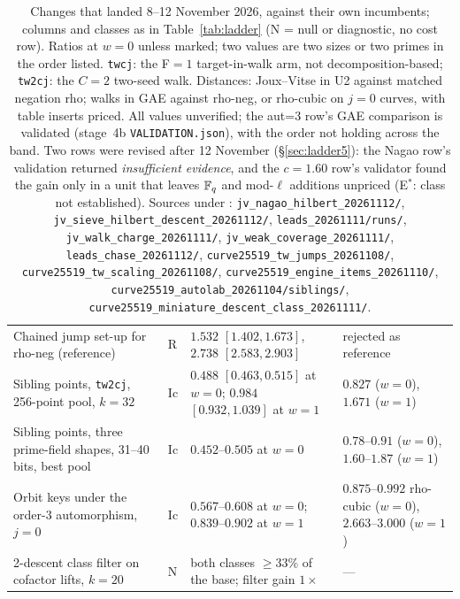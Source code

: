 \begin{table}[p]
\begin{tabularx}{\linewidth}{@{}>{\raggedright}Xl>{\raggedright}p{3.6cm}>{\raggedright\arraybackslash}p{3.4cm}@{}}
Chained jump set-up for rho-neg (reference) & R & $1.532$ $[1.402,1.673]$, $2.738$ $[2.583,2.903]$ & rejected as reference \\
Sibling points, \texttt{tw2cj}, 256-point pool, $k=32$ & Ic & $0.488$ $[0.463,0.515]$ at $w=0$; $0.984$ $[0.932,1.039]$ at $w=1$ & $0.827$ ($w=0$), $1.671$ ($w=1$) \\
Sibling points, three prime-field shapes, 31--40 bits, best pool & Ic & $0.452$--$0.505$ at $w=0$ & $0.78$--$0.91$ ($w=0$), $1.60$--$1.87$ ($w=1$) \\
Orbit keys under the order-3 automorphism, $j=0$ & Ic & $0.567$--$0.608$ at $w=0$; $0.839$--$0.902$ at $w=1$ & $0.875$--$0.992$ rho-cubic ($w=0$), $2.663$--$3.000$ ($w=1$) \\
2-descent class filter on cofactor lifts, $k=20$ & N & both classes $\ge33\%$ of the base; filter gain $1\times$ & --- \\
\bottomrule
\end{tabularx}
\caption[]{Changes that landed 8--12 November 2026, against their own
incumbents; columns and classes as in Table~\ref{tab:ladder} (N = null
or diagnostic, no cost row). Ratios at $w=0$ unless marked; two values
are two sizes or two primes in the order listed. \texttt{twcj}: the F$=1$
target-in-walk arm, not decomposition-based; \texttt{tw2cj}: the $C=2$
two-seed walk. Distances: Joux--Vitse in U2 against matched negation rho;
walks in GAE against rho-neg, or rho-cubic on $j=0$ curves, with table
inserts priced. All values unverified; the aut=3 row's GAE comparison is
validated (stage~4b \texttt{VALIDATION.json}), with the order not holding
across the band. Two rows were revised after 12 November
(\S\ref{sec:ladder5}): the Nagao row's validation returned
\emph{insufficient evidence}, and the $c=1.60$ row's validator found the
gain only in a unit that leaves $\mathbb{F}_q$ and mod-$\ell$ additions unpriced
(E$^{*}$: class not established). Sources under :
\texttt{jv\_nagao\_hilbert\_20261112/}, \texttt{jv\_sieve\_hilbert\_descent\_20261112/},
\texttt{leads\_20261111/runs/}, \texttt{jv\_walk\_charge\_20261111/},
\texttt{jv\_weak\_coverage\_20261111/}, \texttt{leads\_chase\_20261112/},
\texttt{curve25519\_tw\_jumps\_20261108/}, \texttt{curve25519\_tw\_scaling\_20261108/},
\texttt{curve25519\_engine\_items\_20261110/},
\texttt{curve25519\_autolab\_20261104/siblings/},
\texttt{curve25519\_miniature\_descent\_class\_20261111/}.}
\label{tab:ladder4}
\end{table}

